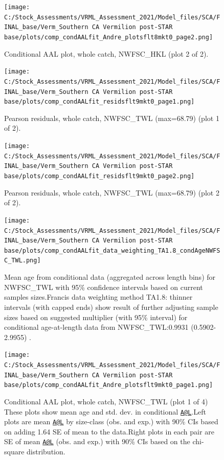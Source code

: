\documentclass[
  english,
  a4paper,
]{article}
\begin{document}
\begin{figure}
\centering
\texttt{[image: C:/Stock\_Assessments/VRML\_Assessment\_2021/Model\_files/SCA/FINAL\_base/Verm\_Southern CA Vermilion post-STAR base/plots/comp\_condAALfit\_Andre\_plotsflt8mkt0\_page2.png]}
\caption{Conditional AAL plot, whole catch, NWFSC\_HKL (plot 2 of 2).\label{fig:comp_condAALfit_Andre_plotsflt8mkt0_page2}}
\end{figure}

\begin{figure}
\centering
\texttt{[image: C:/Stock\_Assessments/VRML\_Assessment\_2021/Model\_files/SCA/FINAL\_base/Verm\_Southern CA Vermilion post-STAR base/plots/comp\_condAALfit\_residsflt9mkt0\_page1.png]}
\caption{Pearson residuals, whole catch, NWFSC\_TWL (max=68.79) (plot 1 of 2).\label{fig:comp_condAALfit_residsflt9mkt0_page1}}
\end{figure}

\begin{figure}
\centering
\texttt{[image: C:/Stock\_Assessments/VRML\_Assessment\_2021/Model\_files/SCA/FINAL\_base/Verm\_Southern CA Vermilion post-STAR base/plots/comp\_condAALfit\_residsflt9mkt0\_page2.png]}
\caption{Pearson residuals, whole catch, NWFSC\_TWL (max=68.79) (plot 2 of 2).\label{fig:comp_condAALfit_residsflt9mkt0_page2}}
\end{figure}

\begin{figure}
\centering
\texttt{[image: C:/Stock\_Assessments/VRML\_Assessment\_2021/Model\_files/SCA/FINAL\_base/Verm\_Southern CA Vermilion post-STAR base/plots/comp\_condAALfit\_data\_weighting\_TA1.8\_condAgeNWFSC\_TWL.png]}
\caption{Mean age from conditional data (aggregated across length bins) for NWFSC\_TWL with 95\% confidence intervals based on current samples sizes.Francis data weighting method TA1.8: thinner intervals (with capped ends) show result of further adjusting sample sizes based on suggested multiplier (with 95\% interval) for conditional age-at-length data from NWFSC\_TWL:0.9931 (0.5902-2.9955) .\label{fig:comp_condAALfit_data_weighting_TA1.8_condAgeNWFSC_TWL}}
\end{figure}

\begin{figure}
\centering
\texttt{[image: C:/Stock\_Assessments/VRML\_Assessment\_2021/Model\_files/SCA/FINAL\_base/Verm\_Southern CA Vermilion post-STAR base/plots/comp\_condAALfit\_Andre\_plotsflt9mkt0\_page1.png]}
\caption{Conditional AAL plot, whole catch, NWFSC\_TWL (plot 1 of 4)
These plots show mean age and std. dev. in conditional \href{mailto:A@L}{\nolinkurl{A@L}}.Left plots are mean \href{mailto:A@L}{\nolinkurl{A@L}} by size-class (obs. and exp.) with 90\% CIs based on adding 1.64 SE of mean to the data.Right plots in each pair are SE of mean \href{mailto:A@L}{\nolinkurl{A@L}} (obs. and exp.) with 90\% CIs based on the chi-square distribution.\label{fig:comp_condAALfit_Andre_plotsflt9mkt0_page1}}
\end{figure}
\end{document}
